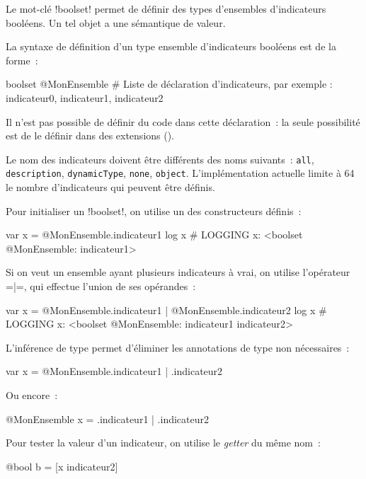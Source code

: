 


Le mot-clé \ggs!boolset! permet de définir des types d'ensembles d'indicateurs booléens. Un tel objet a une sémantique de valeur.

La syntaxe de définition d'un type ensemble d'indicateurs booléens est de la forme~:

\begin{galgas}
boolset @MonEnsemble {
  # Liste de déclaration d'indicateurs, par exemple :
  indicateur0,
  indicateur1,
  indicateur2
}
\end{galgas}

Il n'est pas possible de définir du code dans cette déclaration~: la seule possibilité est de le définir dans des extensions ().

Le nom des indicateurs doivent être différents des noms suivants~: \texttt{all}, \texttt{description}, \texttt{dynamicType}, \texttt{none}, \texttt{object}. L'implémentation actuelle limite à 64 le nombre d'indicateurs qui peuvent être définis.

Pour initialiser un \ggs!boolset!, on utilise un des constructeurs définis~:
\begin{galgas}
var x = @MonEnsemble.indicateur1
log x # LOGGING x: <boolset @MonEnsemble: indicateur1>
\end{galgas}

Si on veut un ensemble ayant plusieurs indicateurs à vrai, on utilise l'opérateur \ggs=|=, qui effectue l'union de ses opérandes~:
\begin{galgas}
var x = @MonEnsemble.indicateur1 | @MonEnsemble.indicateur2
log x # LOGGING x: <boolset @MonEnsemble: indicateur1 indicateur2>
\end{galgas}

L'inférence de type permet d'éliminer les annotations de type non nécessaires~:
\begin{galgas}
var x = @MonEnsemble.indicateur1 | .indicateur2
\end{galgas}

Ou encore~:
\begin{galgas}
@MonEnsemble x = .indicateur1 | .indicateur2
\end{galgas}

Pour tester la valeur d'un indicateur, on utilise le \emph{getter} du même nom~:
\begin{galgas}
@bool b = [x indicateur2]
\end{galgas}










